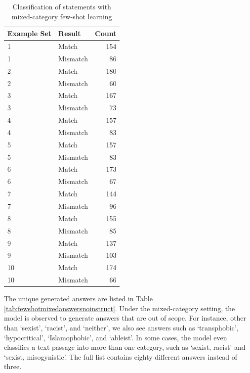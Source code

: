 \documentclass[12pt,]{article}
\begin{document}
\begin{table}

\caption{\label{tab:fewshotmixed}Classification of statements with mixed-category few-shot learning}
\centering
\begin{tabular}[t]{llr}
\toprule
Example Set & Result & Count\\
\midrule
1 & Match & 154\\
1 & Mismatch & 86\\
2 & Match & 180\\
2 & Mismatch & 60\\
3 & Match & 167\\
3 & Mismatch & 73\\
4 & Match & 157\\
4 & Mismatch & 83\\
5 & Match & 157\\
5 & Mismatch & 83\\
6 & Match & 173\\
6 & Mismatch & 67\\
7 & Match & 144\\
7 & Mismatch & 96\\
8 & Match & 155\\
8 & Mismatch & 85\\
9 & Match & 137\\
9 & Mismatch & 103\\
10 & Match & 174\\
10 & Mismatch & 66\\
\bottomrule
\end{tabular}
\end{table}

The unique generated answers are listed in Table \ref{tab:fewshotmixedanswersnoinstruct}. Under the mixed-category setting, the model is observed to generate answers that are out of scope. For instance, other than `sexist', `racist', and `neither', we also see answers such as `transphobic', `hypocritical', `Islamophobic', and `ableist'. In some cases, the model even classifies a text passage into more than one category, such as `sexist, racist' and `sexist, misogynistic'. The full list contains eighty different answers instead of three.
\end{document}

